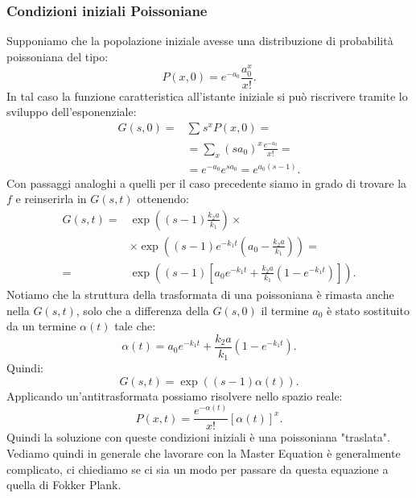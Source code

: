 \subsubsection{Condizioni iniziali Poissoniane}%
\label{subsub:Condizioni iniziali Poissoniane}
Supponiamo che la popolazione iniziale avesse una distribuzione di probabilità poissoniana del tipo:
\[
    P(x,0) = e^{-a_0}\frac{a_0^x}{x!}
.\] 
In tal caso la funzione caratteristica all'istante iniziale si può riscrivere tramite lo sviluppo dell'esponenziale:
\[\begin{aligned}
    G(s,0) =& \sum_{}^{} s^xP(x,0) =\\
	    & = \sum_{x}^{} (sa_0) ^x \frac{e^{-a_0}}{x!} =\\
	    & = e^{-a_0}e^{sa_0} = e^{a_0(s-1) }
.\end{aligned}\]
Con passaggi analoghi a quelli per il caso precedente siamo in grado di trovare la $f$  e reinserirla in $G(s,t)$  ottenendo:
\[\begin{aligned}
    G(s,t) =& \exp\left((s-1) \frac{k_2a}{k_1}\right)\times  \\
	    &\times  \exp\left((s-1)e^{-k_1t}\left(a_0- \frac{k_2a}{k_1}\right)\right)=\\
           =& \exp\left((s-1) \left[a_0 e^{-k_1t} + \frac{k_2a}{k_1}(1-e^{-k_1t})\right]\right)
.\end{aligned}\]
Notiamo che la struttura della trasformata di una poissoniana è rimasta anche nella $G(s,t)$, solo che a differenza della $G(s,0)$  il termine $a_0$  è stato sostituito da un termine $\alpha (t) $  tale che:
\[
    \alpha (t) = a_0 e^{-k_1t} + \frac{k_2a}{k_1}(1-e^{-k_1t})
.\] 
Quindi:
\[
    G(s,t) = \exp\left((s-1) \alpha (t) \right)
.\] 
Applicando un'antitrasformata possiamo risolvere nello spazio reale:
\[
    P(x,t) = \frac{e^{-\alpha (t)}}{x!}\left[\alpha (t) \right]^x
.\] 
Quindi la soluzione con queste condizioni iniziali è una poissoniana "traslata".\\
Vediamo quindi in generale che lavorare con la Master Equation è generalmente complicato, ci chiediamo se ci sia un modo per passare da questa equazione a quella di Fokker Plank.
